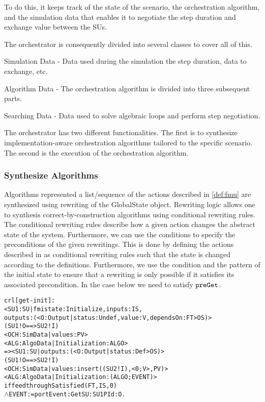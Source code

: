 To do this, it keeps track of the state of the scenario, the orchestration algorithm, and the simulation data that enables it to negotiate the step duration and exchange value between the SUs.

The orchestrator is consequently divided into several classes to cover all of this.
\begin{compactitem}
  \item Simulation Data - Data used during the simulation the step duration, data to exchange, etc.
  \item Algorithm Data - The orchestration algorithm is divided into three subsequent parts. 
  \item Searching Data - Data used to solve algebraic loops and perform step negotiation.
\end{compactitem}

The orchestrator has two different functionalities.
The first is to synthesize implementation-aware orchestration algorithms tailored to the specific scenario.
The second is the execution of the orchestration algorithm. 

\subsubsection{Synthesize Algorithms}
Algorithms represented a list/sequence of the actions described in \cref{def:fmu} are synthesized using rewriting of the GlobalState object.
Rewriting logic allows one to synthesis correct-by-construction algorithms using conditional rewriting rules.
The conditional rewriting rules describe how a given action changes the abstract state of the system.
Furthermore, we can use the conditions to specify the preconditions of the given rewritings.
This is done by defining the actions described in  as conditional rewriting rules such that the state is changed according to the definitions.
Furthermore, we use the condition and the pattern of the initial state to ensure that a rewriting is only possible if it satisfies its associated precondition.
In the case below we need to satisfy $\mathtt{preGet}_{}$.

\begin{alltt}
  \small
  crl [get-init] :
  < SU1 : SU | fmistate : Initialize, inputs : IS, 
    outputs : (< O : Output | status : Undef, value : V, dependsOn : FT > OS) > 
  (SU1 ! O ==> SU2 ! I)
  < OCH : SimData | values : PV > 
  < ALG : AlgoData | Initialization : ALGO >
  => < SU1 : SU | outputs : (< O : Output | status : Def > OS) > 
    (SU1 ! O ==> SU2 ! I)
    < OCH : SimData | values : insert((SU2 ! I), < 0 ; V >, PV) >  
    < ALG : AlgoData | Initialization : (ALGO ; EVENT) >
if feedthroughSatisfied(FT, IS, 0)
  \(\land\) EVENT := portEvent: Get SU: SU1 PId: O . 
\end{alltt}


